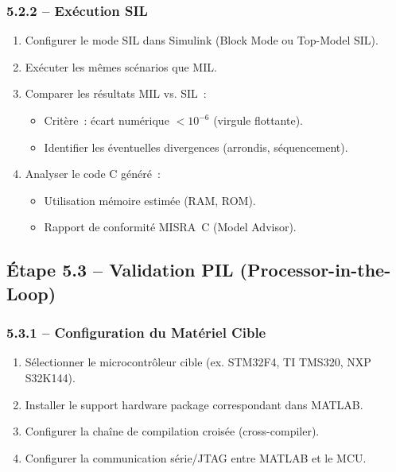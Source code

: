 \documentclass[a4paper,12pt]{article}
\begin{document}
\subsubsection{5.2.2 -- Exécution SIL}
\begin{enumerate}[nosep]
  \item Configurer le mode SIL dans Simulink (Block Mode ou Top-Model SIL).
  \item Exécuter les mêmes scénarios que MIL.
  \item Comparer les résultats MIL vs. SIL~:
    \begin{itemize}[nosep]
      \item Critère~: écart numérique $<10^{-6}$ (virgule flottante).
      \item Identifier les éventuelles divergences (arrondis, séquencement).
    \end{itemize}
  \item Analyser le code C généré~:
    \begin{itemize}[nosep]
      \item Utilisation mémoire estimée (RAM, ROM).
      \item Rapport de conformité MISRA~C (Model Advisor).
    \end{itemize}
\end{enumerate}

\subsection{Étape 5.3 -- Validation PIL (Processor-in-the-Loop)}

\subsubsection{5.3.1 -- Configuration du Matériel Cible}
\begin{enumerate}[nosep]
  \item Sélectionner le microcontrôleur cible (ex. STM32F4, TI TMS320, NXP S32K144).
  \item Installer le support hardware package correspondant dans MATLAB.
  \item Configurer la chaîne de compilation croisée (cross-compiler).
  \item Configurer la communication série/JTAG entre MATLAB et le MCU.
\end{enumerate}
\end{document}
